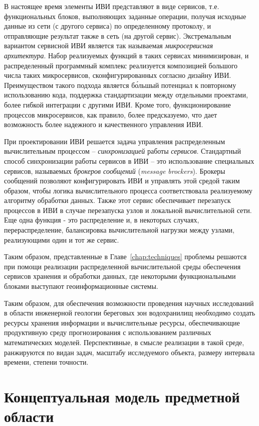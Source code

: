 \documentclass[732,14pt,final]{studrep}
\begin{document}
В настоящее время элементы ИВИ представляют в виде сервисов, т.е. функциональных блоков, выполняющих заданные операции, получая исходные данные из сети (с другого сервиса) по определенному протоколу, и отправляющие результат также в сеть (на другой сервис). Экстремальным вариантом сервисной ИВИ является так называемая \emph{микросервисная архитектура}. Набор реализуемых функций в таких сервисах минимизирован, и распределенный программный комплекс реализуется композицией большого числа таких микросервисов, сконфигурированных согласно дизайну ИВИ. Преимуществом такого подхода является б\'ольшый потенциал к повторному использованию кода, поддержка стандартизации между отдельными проектами, более гибкой интеграции с другими ИВИ. Кроме того, функционирование процессов микросервисов, как правило, более предсказуемо, что дает возможность более надежного и качественного управления ИВИ.

При проектировании ИВИ решается задача управления распределенным вычислительным процессом -- \emph{синхронизацией} работы \emph{сервисов}. Стандартный способ синхронизации работы сервисов в ИВИ -- это использование специальных сервисов, называемых \emph{брокеров сообщений} (\emph{message brockers}). Брокеры сообщений позволяют конфигурировать ИВИ и управлять этой средой таким образом, чтобы логика вычислительного процесса соответствовала реализуемому алгоритму обработки данных. Также этот сервис обеспечивает перезапуск процессов в ИВИ в случае перезапуска узлов и локальной вычислительной сети. Еще одна функция - это распределение и, в некоторых случаях, перераспределение, балансировка вычислительной нагрузки между узлами, реализующими один и тот же сервис.

Таким образом, представленные в Главе~\ref{chap:techniques} проблемы решаются при помощи реализации распределенной вычислительной среды обеспечения сервисов хранения и обработки данных, где некоторыми функциональными блоками выступают геоинформационные системы.

Таким образом, для обеспечения возможности проведения научных исследований в области инженерной геологии береговых зон водохранилищ необходимо создать ресурсы хранения информации и вычислительные ресурсы, обеспечивающие продуктивную среду прогнозирования с использованием различных математических моделей. Перспективные, в смысле реализации в такой среде, ранжируются по видан задач, масштабу исследуемого объекта, размеру интервала времени, степени точности.

\section{Концептуальная модель предметной области}
\end{document}
